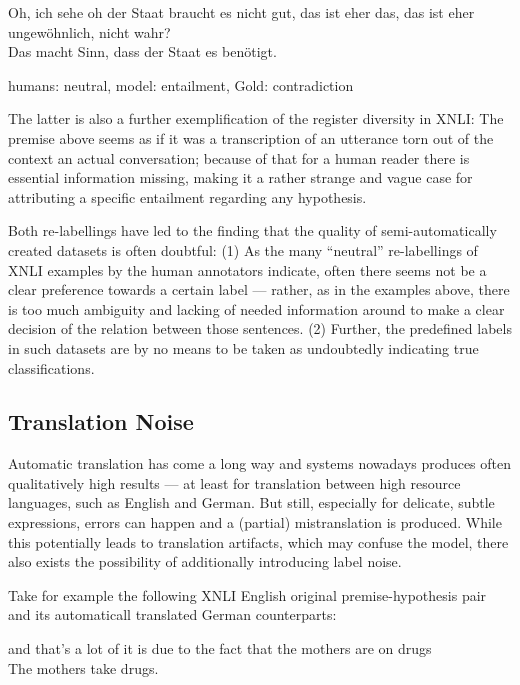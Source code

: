 {\begin{examples}
  \item Oh, ich sehe oh der Staat braucht es nicht gut, das ist eher das, das ist eher ungewöhnlich, nicht wahr?\\
        Das macht Sinn, dass der Staat es benötigt.

        humans: neutral, model: entailment, Gold: contradiction
\end{examples}

The latter is also a further exemplification of the register diversity in XNLI: The premise above seems as if it
was a transcription of an utterance torn out of the context an actual conversation; because of that for a human
reader there is essential information missing, making it a rather strange and vague case for attributing
a specific entailment regarding any hypothesis.


Both re-labellings have led to the finding that the quality of semi-automatically
created datasets is often doubtful: (1) As the many ``neutral'' re-labellings of
XNLI examples by the human annotators indicate, often there seems not be a clear
preference towards a certain label --- rather, as in the examples above, there is
too much ambiguity and lacking of needed information around to make a clear decision
of the relation between those sentences. (2) Further, the predefined labels in such
datasets are by no means to be taken as undoubtedly indicating true classifications.



\subsection{Translation Noise}
\label{sec:translation-noise}

Automatic translation has come a long way and systems nowadays produces often qualitatively high results ---
at least for translation between high resource languages, such as English and German.
But still, especially for delicate, subtle expressions, errors can happen and a (partial) mistranslation
is produced. While this potentially leads to translation artifacts, which may confuse the model, there
also exists the possibility of additionally introducing label noise.

Take for example the following XNLI English original premise-hypothesis pair and its automaticall
translated German counterparts:

\begin{examples}
  \item and that's a lot of it is due to the fact that the mothers are on drugs\\
        The mothers take drugs.


\end{examples}}
